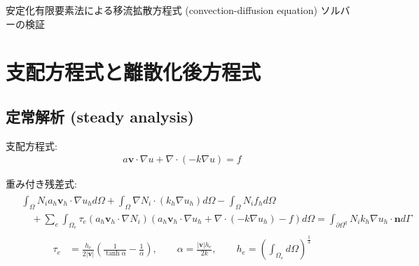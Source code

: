 \documentclass[8pt,a4paper]{article}
\newcommand{\pcl}{\partial}
\newcommand{\bsm}{\boldsymbol}
\begin{document}
 

\begin{center}
	{\Large 安定化有限要素法による移流拡散方程式 (convection-diffusion equation) ソルバーの検証} \\
\end{center}


\section{支配方程式と離散化後方程式}
\subsection*{定常解析 (steady analysis)}
支配方程式:
\begin{align}
	a \bsm{v} \cdot \nabla u + \nabla \cdot \left( -k \nabla u \right) = f
\end{align}

\noindent
重み付き残差式:
\begin{align}
	\begin{split}
		&\int_{\Omega} N_i a_h \bsm{v}_h \cdot \nabla u_h d\Omega + \int_{\Omega} \nabla N_i \cdot \left( k_h \nabla u_h \right) d\Omega - \int_{\Omega} N_i f_h d\Omega \\
		&\quad + \sum_e \int_{\Omega_e} \tau_e \left( a_h \bsm{v}_h \cdot \nabla N_i \right) \left( a_h \bsm{v}_h \cdot \nabla u_h + \nabla \cdot \left( -k \nabla u_h \right) - f \right) d\Omega = 
		\int_{\pcl \Omega^q} N_i k_h \nabla u_h \cdot \bsm{n} d\Gamma 
	\end{split}
\end{align}
\begin{align}
	\tau_e &= \frac{h_e}{2|\bsm{v}|} \left( \frac{1}{\tanh \alpha} - \frac{1}{\alpha} \right), \qquad
	\alpha = \frac{|\bsm{v}| h_e}{2k}, \qquad
	h_e = \left( \int_{\Omega_e} d\Omega \right)^{\frac{1}{3}}
\end{align}
\end{document}
